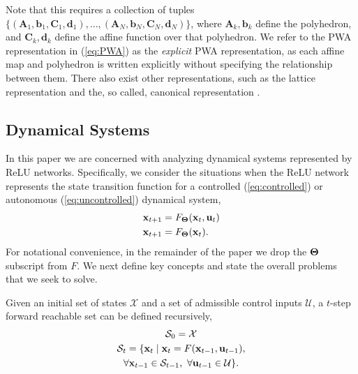 Note that this requires a collection of tuples $\{(\mathbf{A}_1,\mathbf{b}_1, \mathbf{C}_1, \mathbf{d}_1), \ldots, (\mathbf{A}_N,\mathbf{b}_N, \mathbf{C}_N, \mathbf{d}_N)\}$, where $\mathbf{A}_k, \mathbf{b}_k$ define the polyhedron, and $\mathbf{C}_k, \mathbf{d}_k$ define the affine function over that polyhedron. 
We refer to the PWA representation in (\ref{eq:PWA}) as the \textit{explicit} PWA representation, as each affine map and polyhedron is written explicitly without specifying the relationship between them. 
There also exist other representations, such as the lattice representation \cite{lattice_orig,lattice_irred} and the, so called, canonical representation \cite{canonical, pwa_comp}. 



\subsection{Dynamical Systems}
In this paper we are concerned with analyzing dynamical systems represented by ReLU networks.
Specifically, we consider the situations when the ReLU network represents the state transition function for a controlled (\ref{eq:controlled}) or autonomous (\ref{eq:uncontrolled}) dynamical system,
\begin{align}
    \mathbf{x}_{t+1} &= F_{\mathbf{\Theta}}(\mathbf{x}_t, \mathbf{u}_t) \label{eq:controlled} \\
    \mathbf{x}_{t+1} &= F_{\mathbf{\Theta}}(\mathbf{x}_t) \label{eq:uncontrolled}.
\end{align}
For notational convenience, in the remainder of the paper we drop the $\mathbf{\Theta}$ subscript from $F$.
We next define key concepts and state the overall problems that we seek to solve.

\begin{definition}
    Given an initial set of states $\mathcal{X}$ and a set of admissible control inputs $\mathcal{U}$, a $t$-step forward reachable set can be defined recursively,
    \begin{gather*}
    \mathcal{S}_0 = \mathcal{X} \\
        \mathcal{S}_{t} = \{\mathbf{x}_{t} \mid \mathbf{x}_{t} = F(\mathbf{x}_{t-1}, \mathbf{u}_{t-1}),\\ \forall \mathbf{x}_{t-1} \in \mathcal{S}_{t-1},\ \forall \mathbf{u}_{t-1} \in \mathcal{U}\}.
    \end{gather*}
\end{definition}

